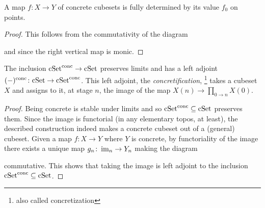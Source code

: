 \begin{lemma}\label{lem:concrete-morphism}
A map $f\colon X\to Y$ of concrete cubesets is fully determined by its value $f_0$ on points.
\end{lemma}

\begin{proof}
This follows from the commutativity of the diagram
\begin{center}
\end{center}
and since the right vertical map is monic.
\end{proof}

\begin{proposition}\label{prop:concrete-left-adjoint}
The inclusion $\mathrm{cSet}^\mathrm{conc}\to\mathrm{cSet}$ preserves limits and has a left adjoint $(-)^\mathrm{conc}\colon\mathrm{cSet}\to\mathrm{cSet}^\mathrm{conc}$.
This left adjoint, the \emph{concretification},%
\footnote{also called concretization}
takes a cubeset $X$ and assigns to it, at stage $n$, the image of the map $X(n)\to\prod_{0\to n}X(0)$.
\end{proposition}

\begin{proof}
Being concrete is stable under limits and so $\mathrm{cSet}^\mathrm{conc}\subseteq\mathrm{cSet}$ preserves them.
Since the image is functorial (in any elementary topos, at least),
the described construction indeed makes a concrete cubeset out of a (general) cubeset.
Given a map $f\colon X\to Y$ where $Y$ is concrete, by functoriality of the image
there exists a unique map $g_n\colon\operatorname{im}_n\to Y_n$ making the diagram
\begin{center}
\end{center}
commutative.
This shows that taking the image is left adjoint to the inclusion $\mathrm{cSet}^\mathrm{conc}\subseteq\mathrm{cSet}$.
\end{proof}

